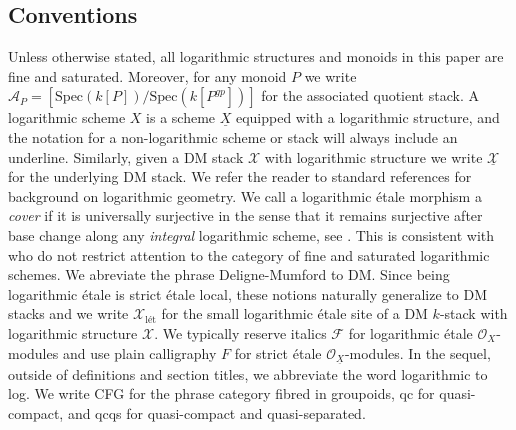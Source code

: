 \documentclass[11pt]{amsart}
\theoremstyle{definition}
\theoremstyle{definition}
\newcommand{\cA}{\mathcal{A}}
\newcommand{\cX}{\mathcal{X}}
\newcommand{\cal}{\mathcal}
\def\cA{{\cal A}}
\def\cX{{\cal X}}
\begin{document}
\subsection*{Conventions}
Unless otherwise stated, all logarithmic structures and monoids in this paper are fine and saturated. Moreover, for any monoid $P$ we write $\cA_P= [\text{Spec}(k[P])/\text{Spec}(k[P^{gp}])]$ for the associated quotient stack. A logarithmic scheme $X$ is a scheme $\underline{X}$ equipped with a logarithmic structure, and the notation for a non-logarithmic scheme or stack will always include an underline. Similarly, given a DM stack $\mathcal{X}$ with logarithmic structure we write $\underline{\mathcal{X}}$ for the underlying DM stack. 
We refer the reader to standard references \cite{Logarithmic-structures-of-Fontaine-Illuie-I-Kato,lecturesonlogarithmicalgebraicgeometry,temkin2022introductionlogarithmicgeometry} for background on logarithmic geometry. We call a logarithmic \'etale morphism a \emph{cover} if it is universally surjective in the sense that it remains surjective after base change along any \emph{integral} logarithmic scheme, see \cite{m-type-topology}. This is consistent with \cite{MolchoWise} who do not restrict attention to the category of fine and saturated logarithmic schemes. We abreviate the phrase Deligne-Mumford to DM. Since being logarithmic \'etale is strict \'etale local, these notions naturally generalize to DM stacks and we write $\cX_{\text{l\'et}}$ for the small logarithmic \'etale site of a DM $k$-stack with logarithmic structure $\cX$.
We typically reserve italics $\mathcal{F}$ for logarithmic \'etale $\mathcal{O}_X$-modules and use plain calligraphy $F$ for strict \'etale $\mathcal{O}_{\underline{X}}$-modules. 
In the sequel, outside of definitions and section titles, we abbreviate the word logarithmic to log. We write CFG for the phrase category fibred in groupoids, qc for quasi-compact, and qcqs for quasi-compact and quasi-separated.
\end{document}
